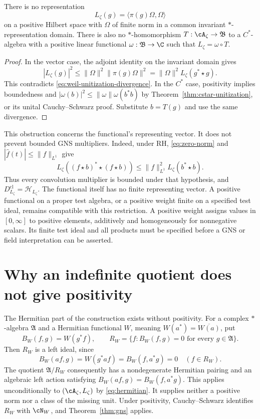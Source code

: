 \begin{corollary}
\label{cor:weil-carriers}
There is no representation
\[
 L_\zeta(g)=\langle\pi(g)\Omega,\Omega\rangle
\]
on a positive Hilbert space with $\Omega$ of finite norm in a common
invariant $*$-representation domain.
There is also no $*$-homomorphism $T:\cA_\zeta\to\mathfrak B$ to a
$C^*$-algebra with a positive linear functional
$\omega:\mathfrak B\to\C$ such that $L_\zeta=\omega\circ T$.
\end{corollary}

\begin{proof}
In the vector case, the adjoint identity on the invariant domain gives
\[
 |L_\zeta(g)|^2
 \leq\|\Omega\|^2\|\pi(g)\Omega\|^2
 =\|\Omega\|^2L_\zeta(g^*\star g).
\]
This contradicts \eqref{eq:weil-unitization-divergence}.
In the $C^*$ case, positivity implies boundedness and
$|\omega(b)|^2\leq\|\omega\|\omega(b^*b)$ by
Theorem~\ref{thm:cstar-unitization}, or its unital Cauchy--Schwarz proof.
Substitute $b=T(g)$ and use the same divergence.
\end{proof}

This obstruction concerns the functional's representing vector.
It does not prevent bounded GNS multipliers.  Indeed, under RH,
\eqref{eq:zero-norm} and $|\widehat f(t)|\leq\|f\|_{L^1}$ give
\[
 L_\zeta((f\star b)^*\star(f\star b))
 \leq\|f\|_{L^1}^2 L_\zeta(b^*\star b).
\]
Thus every convolution multiplier is bounded under that hypothesis,
and $D_{L_\zeta}^{\mathrm{cl}}=\mathcal H_{L_\zeta}$.
The functional itself has no finite representing vector.
A positive functional on a proper test algebra, or a positive weight
finite on a specified test ideal, remains compatible with this restriction.
A positive weight assigns values in $[0,\infty]$ to positive elements,
additively and homogeneously for nonnegative scalars.  Its finite test
ideal and all products must be specified before a GNS or field
interpretation can be asserted.

\section{Why an indefinite quotient does not give positivity}

The Hermitian part of the construction exists without positivity.
For a complex $*$-algebra $\mathfrak A$ and a Hermitian functional $W$,
meaning $W(a^*)=\overline{W(a)}$, put
\[
 B_W(f,g)=W(g^*f),\qquad
 R_W=\{f:B_W(f,g)=0\text{ for every }g\in\mathfrak A\}.
\]
Then $R_W$ is a left ideal, since
\[
 B_W(af,g)=W(g^*af)=B_W(f,a^*g)=0\quad(f\in R_W).
\]
The quotient $\mathfrak A/R_W$ consequently has a nondegenerate Hermitian
pairing and an algebraic left action satisfying
$B_W(af,g)=B_W(f,a^*g)$.
This applies unconditionally to $(\cA_\zeta,L_\zeta)$ by
\eqref{eq:hermitian}.  It supplies neither a positive norm nor a class of
the missing unit.  Under positivity, Cauchy--Schwarz identifies $R_W$
with $\cN_W$, and Theorem~\ref{thm:gns} applies.

